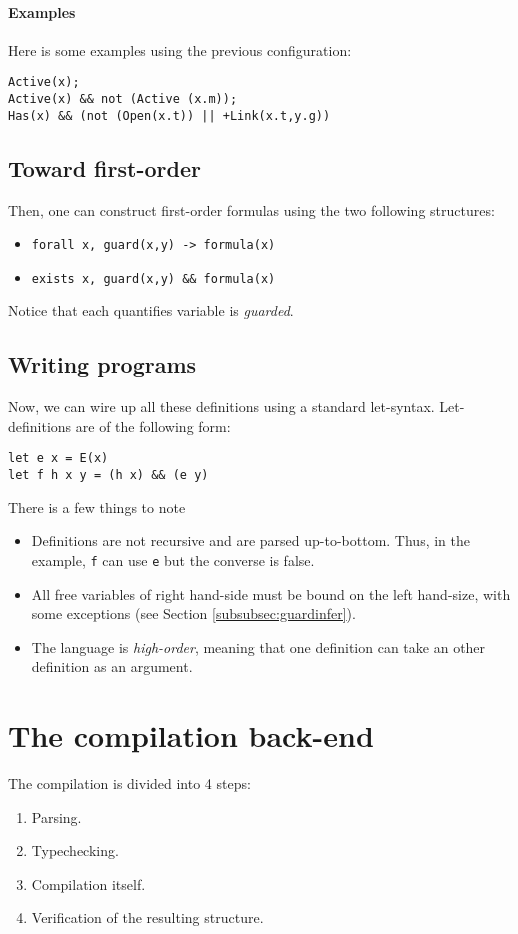 \documentclass[10pt,a4paper]{article}
\newcommand{\ocaml}{\texttt}
\begin{document}
\paragraph{Examples}
Here is some examples using the previous configuration:
\begin{verbatim}
Active(x);
Active(x) && not (Active (x.m));
Has(x) && (not (Open(x.t)) || +Link(x.t,y.g))
\end{verbatim}

\subsection{Toward first-order}
Then, one can construct first-order formulas using the two following structures:
\begin{itemize}
\item \ocaml{forall x, guard(x,y) -> formula(x)}
\item \ocaml{exists x, guard(x,y) && formula(x)}
\end{itemize}
Notice that each quantifies variable is \emph{guarded}.

\subsection{Writing programs}
Now, we can wire up all these definitions using a standard let-syntax. Let-definitions are of the following form:
\begin{verbatim}
let e x = E(x)
let f h x y = (h x) && (e y)
\end{verbatim}
There is a few things to note
\begin{itemize}
\item Definitions are not recursive and are parsed up-to-bottom. Thus, in the example, \ocaml{f} can use \ocaml{e} but the converse is false.
\item All free variables of right hand-side must be bound on the left hand-size, with some exceptions (see Section \ref{subsubsec:guardinfer}).
\item The language is \emph{high-order}, meaning that one definition can take an other definition as an argument.
\end{itemize}

\section{The compilation back-end}
The compilation is divided into 4 steps:
\begin{enumerate}
\item Parsing.
\item Typechecking.
\item Compilation itself.
\item Verification of the resulting structure.
\end{enumerate}
\end{document}
